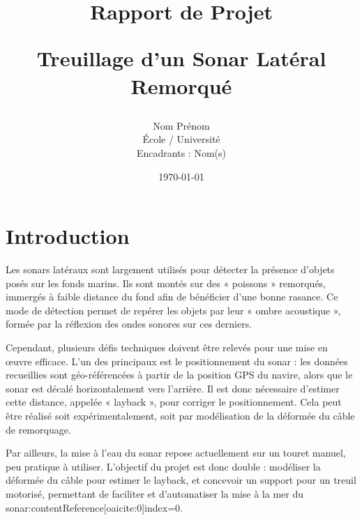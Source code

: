 \documentclass[12pt,a4paper]{article}
\title{\textbf{Rapport de Projet} \\


\vspace{0.3cm}


\large Treuillage d’un Sonar Latéral Remorqué}
\author{Nom Prénom \\


École / Université \\


Encadrants : Nom(s)}
\date{\today}
\begin{document}
\maketitle


\tableofcontents


\newpage












\section{Introduction}












Les sonars latéraux sont largement utilisés pour détecter la présence d’objets posés sur les fonds marins. Ils sont montés sur des « poissons » remorqués, immergés à faible distance du fond afin de bénéficier d’une bonne rasance. Ce mode de détection permet de repérer les objets par leur « ombre acoustique », formée par la réflexion des ondes sonores sur ces derniers.






Cependant, plusieurs défis techniques doivent être relevés pour une mise en œuvre efficace. L’un des principaux est le positionnement du sonar : les données recueillies sont géo-référencées à partir de la position GPS du navire, alors que le sonar est décalé horizontalement vers l’arrière. Il est donc nécessaire d’estimer cette distance, appelée « layback », pour corriger le positionnement. Cela peut être réalisé soit expérimentalement, soit par modélisation de la déformée du câble de remorquage.






Par ailleurs, la mise à l’eau du sonar repose actuellement sur un touret manuel, peu pratique à utiliser. L’objectif du projet est donc double : modéliser la déformée du câble pour estimer le layback, et concevoir un support pour un treuil motorisé, permettant de faciliter et d’automatiser la mise à la mer du sonar:contentReference[oaicite:0]{index=0}.
\end{document}
